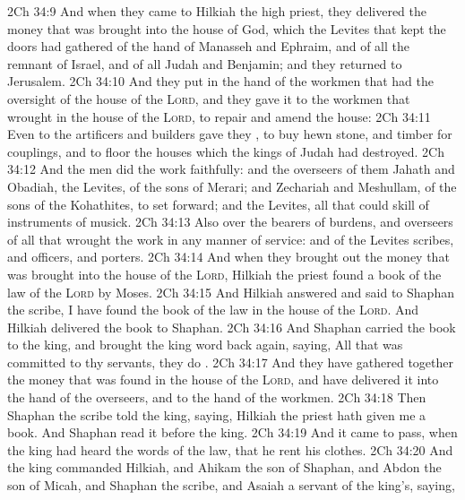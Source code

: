 \vs 2Ch 34:9 And when they came to Hilkiah the high priest, they delivered the money that was brought into the house of God, which the Levites that kept the doors had gathered of the hand of Manasseh and Ephraim, and of all the remnant of Israel, and of all Judah and Benjamin; and they returned to Jerusalem.
\vs 2Ch 34:10 And they put  in the hand of the workmen that had the oversight of the house of the \textsc{Lord}, and they gave it to the workmen that wrought in the house of the \textsc{Lord}, to repair and amend the house:
\vs 2Ch 34:11 Even to the artificers and builders gave they , to buy hewn stone, and timber for couplings, and to floor the houses which the kings of Judah had destroyed.
\vs 2Ch 34:12 And the men did the work faithfully: and the overseers of them  Jahath and Obadiah, the Levites, of the sons of Merari; and Zechariah and Meshullam, of the sons of the Kohathites, to set  forward; and  the Levites, all that could skill of instruments of musick.
\vs 2Ch 34:13 Also  over the bearers of burdens, and  overseers of all that wrought the work in any manner of service: and of the Levites  scribes, and officers, and porters.
\vs 2Ch 34:14 And when they brought out the money that was brought into the house of the \textsc{Lord}, Hilkiah the priest found a book of the law of the \textsc{Lord}  by Moses.
\vs 2Ch 34:15 And Hilkiah answered and said to Shaphan the scribe, I have found the book of the law in the house of the \textsc{Lord}. And Hilkiah delivered the book to Shaphan.
\vs 2Ch 34:16 And Shaphan carried the book to the king, and brought the king word back again, saying, All that was committed to thy servants, they do .
\vs 2Ch 34:17 And they have gathered together the money that was found in the house of the \textsc{Lord}, and have delivered it into the hand of the overseers, and to the hand of the workmen.
\vs 2Ch 34:18 Then Shaphan the scribe told the king, saying, Hilkiah the priest hath given me a book. And Shaphan read it before the king.
\vs 2Ch 34:19 And it came to pass, when the king had heard the words of the law, that he rent his clothes.
\vs 2Ch 34:20 And the king commanded Hilkiah, and Ahikam the son of Shaphan, and Abdon the son of Micah, and Shaphan the scribe, and Asaiah a servant of the king's, saying,
